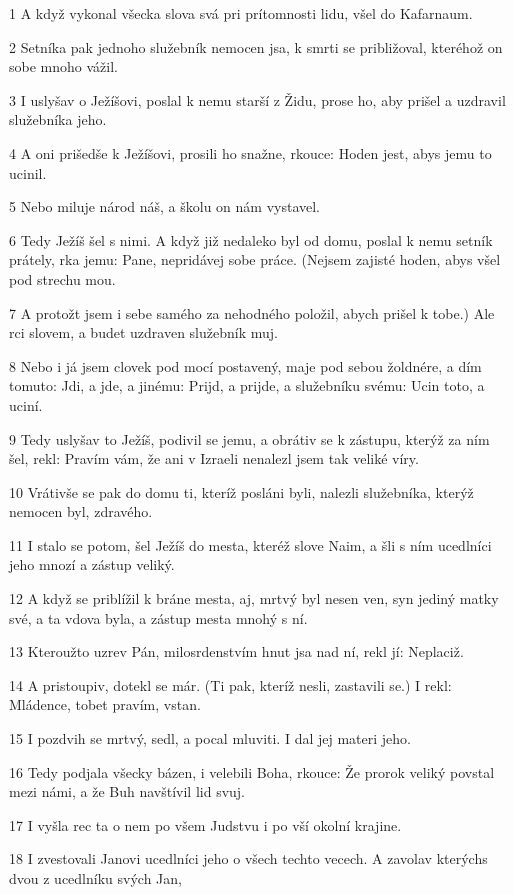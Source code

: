 \par 1 A když vykonal všecka slova svá pri prítomnosti lidu, všel do Kafarnaum.
\par 2 Setníka pak jednoho služebník nemocen jsa, k smrti se približoval, kteréhož on sobe mnoho vážil.
\par 3 I uslyšav o Ježíšovi, poslal k nemu starší z Židu, prose ho, aby prišel a uzdravil služebníka jeho.
\par 4 A oni prišedše k Ježíšovi, prosili ho snažne, rkouce: Hoden jest, abys jemu to ucinil.
\par 5 Nebo miluje národ náš, a školu on nám vystavel.
\par 6 Tedy Ježíš šel s nimi. A když již nedaleko byl od domu, poslal k nemu setník prátely, rka jemu: Pane, nepridávej sobe práce. (Nejsem zajisté hoden, abys všel pod strechu mou.
\par 7 A protožt jsem i sebe samého za nehodného položil, abych prišel k tobe.) Ale rci slovem, a budet uzdraven služebník muj.
\par 8 Nebo i já jsem clovek pod mocí postavený, maje pod sebou žoldnére, a dím tomuto: Jdi, a jde, a jinému: Prijd, a prijde, a služebníku svému: Ucin toto, a uciní.
\par 9 Tedy uslyšav to Ježíš, podivil se jemu, a obrátiv se k zástupu, kterýž za ním šel, rekl: Pravím vám, že ani v Izraeli nenalezl jsem tak veliké víry.
\par 10 Vrátivše se pak do domu ti, kteríž posláni byli, nalezli služebníka, kterýž nemocen byl, zdravého.
\par 11 I stalo se potom, šel Ježíš do mesta, kteréž slove Naim, a šli s ním ucedlníci jeho mnozí a zástup veliký.
\par 12 A když se priblížil k bráne mesta, aj, mrtvý byl nesen ven, syn jediný matky své, a ta vdova byla, a zástup mesta mnohý s ní.
\par 13 Kteroužto uzrev Pán, milosrdenstvím hnut jsa nad ní, rekl jí: Neplaciž.
\par 14 A pristoupiv, dotekl se már. (Ti pak, kteríž nesli, zastavili se.) I rekl: Mládence, tobet pravím, vstan.
\par 15 I pozdvih se mrtvý, sedl, a pocal mluviti. I dal jej materi jeho.
\par 16 Tedy podjala všecky bázen, i velebili Boha, rkouce: Že prorok veliký povstal mezi námi, a že Buh navštívil lid svuj.
\par 17 I vyšla rec ta o nem po všem Judstvu i po vší okolní krajine.
\par 18 I zvestovali Janovi ucedlníci jeho o všech techto vecech. A zavolav kterýchs dvou z ucedlníku svých Jan,
